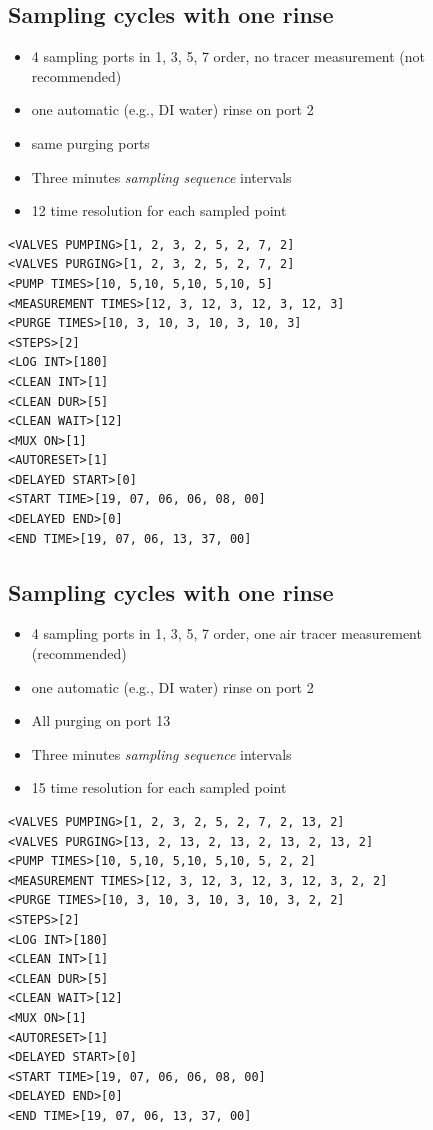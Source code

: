\documentclass[]{book}
\providecommand{\tightlist}{%
  \setlength{\itemsep}{0pt}\setlength{\parskip}{0pt}}
\begin{document}
\hypertarget{sampling-cycles-with-one-rinse}{%
\subsection{Sampling cycles with one rinse}\label{sampling-cycles-with-one-rinse}}

\begin{itemize}
\tightlist
\item
  4 sampling ports in 1, 3, 5, 7 order, no tracer measurement (not recommended)
\item
  one automatic (e.g., DI water) rinse on port 2
\item
  same purging ports
\item
  Three minutes \emph{sampling sequence} intervals
\item
  12 time resolution for each sampled point
\end{itemize}

\begin{verbatim}
<VALVES PUMPING>[1, 2, 3, 2, 5, 2, 7, 2]
<VALVES PURGING>[1, 2, 3, 2, 5, 2, 7, 2]
<PUMP TIMES>[10, 5,10, 5,10, 5,10, 5]
<MEASUREMENT TIMES>[12, 3, 12, 3, 12, 3, 12, 3]
<PURGE TIMES>[10, 3, 10, 3, 10, 3, 10, 3]
<STEPS>[2]
<LOG INT>[180]
<CLEAN INT>[1]
<CLEAN DUR>[5]
<CLEAN WAIT>[12]
<MUX ON>[1]
<AUTORESET>[1]
<DELAYED START>[0]
<START TIME>[19, 07, 06, 06, 08, 00]
<DELAYED END>[0]
<END TIME>[19, 07, 06, 13, 37, 00]
\end{verbatim}

\hypertarget{sampling-cycles-with-one-rinse-1}{%
\subsection{Sampling cycles with one rinse}\label{sampling-cycles-with-one-rinse-1}}

\begin{itemize}
\tightlist
\item
  4 sampling ports in 1, 3, 5, 7 order, one air tracer measurement (recommended)
\item
  one automatic (e.g., DI water) rinse on port 2
\item
  All purging on port 13
\item
  Three minutes \emph{sampling sequence} intervals
\item
  15 time resolution for each sampled point
\end{itemize}

\begin{verbatim}
<VALVES PUMPING>[1, 2, 3, 2, 5, 2, 7, 2, 13, 2]
<VALVES PURGING>[13, 2, 13, 2, 13, 2, 13, 2, 13, 2]
<PUMP TIMES>[10, 5,10, 5,10, 5,10, 5, 2, 2]
<MEASUREMENT TIMES>[12, 3, 12, 3, 12, 3, 12, 3, 2, 2]
<PURGE TIMES>[10, 3, 10, 3, 10, 3, 10, 3, 2, 2]
<STEPS>[2]
<LOG INT>[180]
<CLEAN INT>[1]
<CLEAN DUR>[5]
<CLEAN WAIT>[12]
<MUX ON>[1]
<AUTORESET>[1]
<DELAYED START>[0]
<START TIME>[19, 07, 06, 06, 08, 00]
<DELAYED END>[0]
<END TIME>[19, 07, 06, 13, 37, 00]
\end{verbatim}
\end{document}
